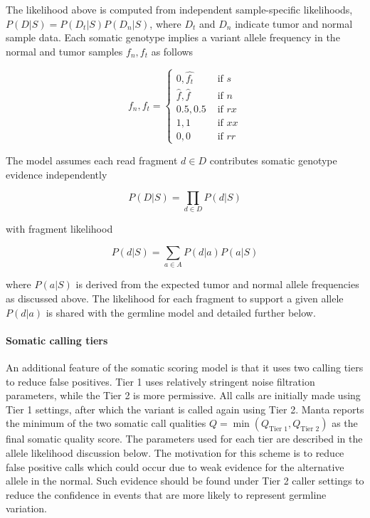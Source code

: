 \documentclass{article}
\begin{document}
The likelihood above is computed from independent sample-specific likelihoods, $P( D \vert S ) = P( D_t \vert S )P( D_n \vert S )$, where $D_t$ and $D_n$ indicate tumor and normal sample data. Each somatic genotype implies a variant allele frequency in the normal and tumor samples $f_n,f_t$ as follows

\begin{equation*}
f_n, f_t =
\left\{
\begin{array}{rl}
0, \hat{f_t} & \mbox{ if $s$} \\
\hat{f}, \hat{f} & \mbox{ if $n$} \\
0.5, 0.5 & \mbox{ if $rx$} \\
1, 1 & \mbox{ if $xx$} \\
0, 0 & \mbox{ if $rr$}
\end{array}
\right.
\end{equation*}

The model assumes each read fragment $d \in D$ contributes somatic genotype evidence independently

\begin{equation*}
P(D \vert S) = \prod_{d \in D} P(d \vert S)
\end{equation*}

\noindent
with fragment likelihood

\begin{equation*}
P(d \vert S) = \sum_{a \in A} P(d \vert a) P(a | S)
\end{equation*}

\noindent
where $P(a|S)$ is derived from the expected tumor and normal allele frequencies as discussed above. The likelihood for each fragment to support a given allele $P(d \vert a)$ is shared with the germline model and detailed further below.

\paragraph{Somatic calling tiers}

An additional feature of the somatic scoring model is that it uses two calling tiers to reduce false positives. Tier 1 uses relatively stringent noise filtration parameters, while the Tier 2 is more permissive. All calls are initially made using Tier 1 settings, after which the variant is called again using Tier 2. Manta reports the minimum of the two somatic call qualities $Q = \min(Q_{\text{Tier 1}},Q_{\text{Tier 2}})$ as the final somatic quality score. The parameters used for each tier are described in the allele likelihood discussion below. The motivation for this scheme is to reduce false positive calls which could occur due to weak evidence for the alternative allele in the normal. Such evidence should be found under Tier 2 caller settings to reduce the confidence in events that are more likely to represent germline variation.
\end{document}
